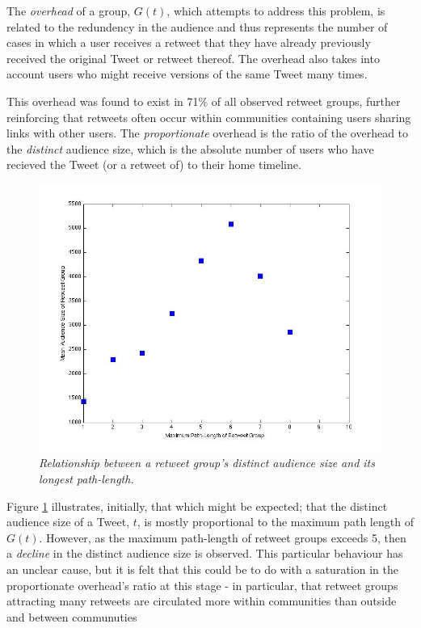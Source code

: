 The \textit{overhead} of a group, $G(t)$, which attempts to address this problem, is related to the redundency in the audience and thus represents the number of cases in which a user receives a retweet that they have already previously received the original Tweet or retweet thereof. The overhead also takes into account users who might receive versions of the same Tweet many times.

This overhead was found to exist in 71\% of all observed retweet groups, further reinforcing that retweets often occur within communities containing users sharing links with other users. The \textit{proportionate} overhead is the ratio of the overhead to the \textit{distinct} audience size, which is the absolute number of users who have recieved the Tweet (or a retweet of) to their home timeline.\\

\begin{figure}[h]
\centering
\includegraphics[scale=0.35]{3.Chapter1/Media/audience-pathlength.jpg} 
\caption{\textit{Relationship between a retweet group's distinct audience size and its longest path-length.}}
\label{fig:pathlength-audience}
\end{figure}

Figure \ref{fig:pathlength-audience} illustrates, initially, that which might be expected; that the distinct audience size of a Tweet, $t$, is mostly proportional to the maximum path length of $G(t)$. However, as the maximum path-length of retweet groups exceeds 5, then a \textit{decline} in the distinct audience size is observed. This particular behaviour has an unclear cause, but it is felt that this could be to do with a saturation in the proportionate overhead's ratio at this stage - in particular, that retweet groups attracting many retweets are circulated more within communities than outside and between communuties 

